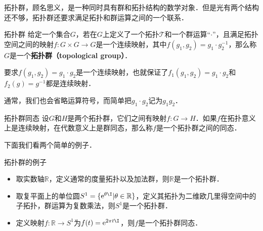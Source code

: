 

拓扑群，顾名思义，是一种同时具有群和拓扑结构的数学对象．但是光有两个结构还不够，拓扑群还要求满足拓扑和群运算之间的一个联系．

\begin{definition}{拓扑群}
给定一个集合$G$，若在$G$上定义了一个拓扑$\mathcal{T}$和一个群运算“$\cdot$”，且满足拓扑空间之间的映射$f:G\times G\rightarrow G$是一个连续映射，其中$f(g_1, g_2)=g_1\cdot g_2^{-1}$，那么称$G$是一个\textbf{拓扑群（topological group）}．
\end{definition}

要求$f(g_1, g_2)=g_1\cdot g_2$是一个连续映射，也就保证了$f_1(g_1, g_2)=g_1\cdot g_2$和$f_2(g)=g^{-1}$都是连续映射．

通常，我们也会省略运算符号，而简单把$g_1\cdot g_2$记为$g_1g_2$．

\begin{definition}{拓扑群同态}
设$G$和$H$是两个拓扑群，它们之间有映射$f:G\rightarrow H$．如果$f$在拓扑意义上是连续映射，在代数意义上是群同态，那么称$f$是一个拓扑群之间的同态．
\end{definition}

下面我们看两个简单的例子．

\begin{example}{拓扑群的例子}
\begin{itemize}
\item 取实数轴$\mathbb{R}$，定义通常的度量拓扑以及加法群，则$\mathbb{R}$是一个拓扑群．
\item 取复平面上的单位圆$S^1=\{\mathrm{e}^{\theta\I}|\theta\in\mathbb{R}\}$，定义其拓扑为二维欧几里得空间中的子拓扑，群运算为复数乘法，则$S^1$是一个拓扑群．
\item 定义映射$f:\mathbb{R}\rightarrow S^1$为$f(t)=\mathrm{e}^{2\pi t\I}$，则$f$是一个拓扑群同态．
\end{itemize}
\end{example}

